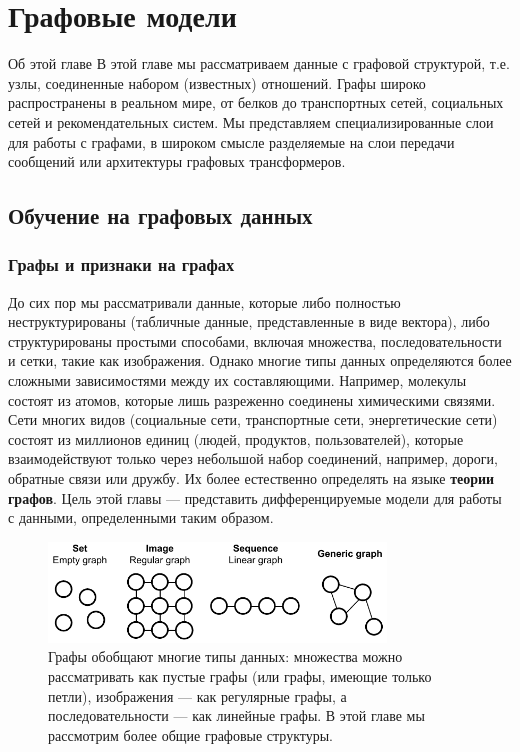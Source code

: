 \chapter{Графовые модели}
\label{chap:gnns}

\begin{supportbox}{Об этой главе}
В этой главе мы рассматриваем данные с графовой структурой, т.е. узлы, соединенные набором (известных) отношений. Графы широко распространены в реальном мире, от белков до транспортных сетей, социальных сетей и рекомендательных систем. Мы представляем специализированные слои для работы с графами, в широком смысле разделяемые на слои передачи сообщений или архитектуры графовых трансформеров.
\end{supportbox}

\section{Обучение на графовых данных}
\subsection{Графы и признаки на графах}

До сих пор мы рассматривали данные, которые либо полностью неструктурированы (табличные данные, представленные в виде вектора), либо структурированы простыми способами, включая множества, последовательности и сетки, такие как изображения. Однако многие типы данных определяются более сложными зависимостями между их составляющими. Например, молекулы состоят из атомов, которые лишь разреженно соединены химическими связями. Сети многих видов (социальные сети, транспортные сети, энергетические сети) состоят из миллионов единиц (людей, продуктов, пользователей), которые взаимодействуют только через небольшой набор соединений, например, дороги, обратные связи или дружбу. Их более естественно определять на языке \textbf{теории графов}. Цель этой главы — представить дифференцируемые модели для работы с данными, определенными таким образом.

\begin{figure}[t]
    \centering
    \includegraphics[width=0.8\textwidth]{images/graphs}
    \caption{Графы обобщают многие типы данных: множества можно рассматривать как пустые графы (или графы, имеющие только петли), изображения — как регулярные графы, а последовательности — как линейные графы. В этой главе мы рассмотрим более общие графовые структуры.}
    \label{fig:graphs}
\end{figure}

